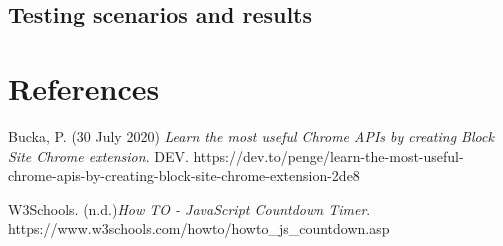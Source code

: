 \documentclass[12pt]{article}
\begin{document}
\subsection{Testing scenarios and results}

\section{References}

\begingroup
\renewcommand{\section}[2]{}
\begin{thebibliography}{10}
    Bucka, P. (30 July 2020) \textit{Learn the most useful Chrome APIs by creating Block Site Chrome extension}.
    DEV. https://dev.to/penge/learn-the-most-useful-chrome-apis-by-creating-block-site-chrome-extension-2de8

    W3Schools. (n.d.)\textit{How TO - JavaScript Countdown Timer}. https://www.w3schools.com/howto/howto_js_countdown.asp

    \bigskip
\end{thebibliography}
\endgroup
\end{document}
